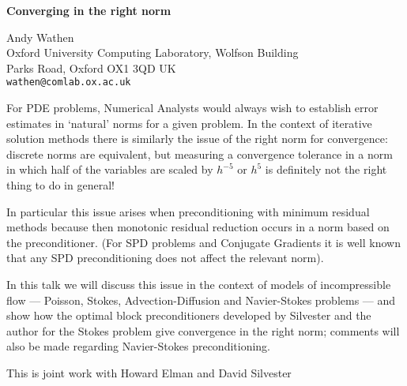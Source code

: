 \documentclass{report}
\begin{document}

\begin{center}
{\large
{\bf Converging in the right norm}}

	Andy Wathen \\
	Oxford University Computing Laboratory, Wolfson Building \\
	Parks Road, Oxford OX1 3QD UK \\
	{\tt wathen@comlab.ox.ac.uk}
\end{center}
For PDE problems, Numerical Analysts would always wish to
establish error estimates in `natural' norms for a given
problem. In the context of iterative solution methods there
is similarly the issue of the right norm for convergence:
discrete norms are equivalent, but measuring a convergence
tolerance in a norm in which half of the variables are
scaled by $h^{-5}$ or $h^5$ is definitely not the right
thing to do in general! 

In particular this issue arises
when preconditioning with minimum residual methods because
then monotonic residual reduction occurs in a norm based on
the preconditioner. (For SPD problems and Conjugate
Gradients it is well known that any SPD preconditioning does
not affect the relevant norm). 

In this talk we will
discuss this issue in the context of models of
incompressible flow --- Poisson, Stokes, Advection-Diffusion
and Navier-Stokes problems --- and show how the optimal block
preconditioners developed by Silvester and the author for
the Stokes problem give convergence in the right norm;
comments will also be made regarding Navier-Stokes
preconditioning.

This is joint work with Howard Elman
and David Silvester



\end{document}
